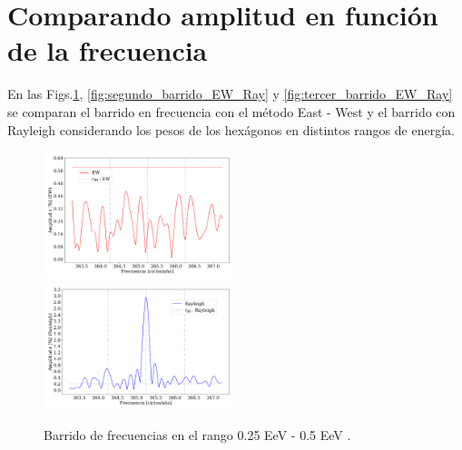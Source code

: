 \section{Comparando amplitud en función de la frecuencia}

En las Figs.\ref{fig:primer_barrido_EW_Ray}, \ref{fig:segundo_barrido_EW_Ray} y \ref{fig:tercer_barrido_EW_Ray} se comparan el barrido en frecuencia con el método East - West y el barrido con Rayleigh considerando los pesos de los hexágonos en distintos rangos de energía.


\begin{figure}[H]
    \begin{small}
        \begin{center}
            \includegraphics[width=0.4955\textwidth]{plot_bin_1_barrido_v3_EW.pdf}
            \includegraphics[width=0.4955\textwidth]{plot_bin_1_barrido_v1_Ray.pdf}
        \end{center}
        \caption{Barrido de frecuencias en el rango 0.25 EeV - 0.5 EeV .}
        \label{fig:primer_barrido_EW_Ray}
    \end{small}
\end{figure}    

